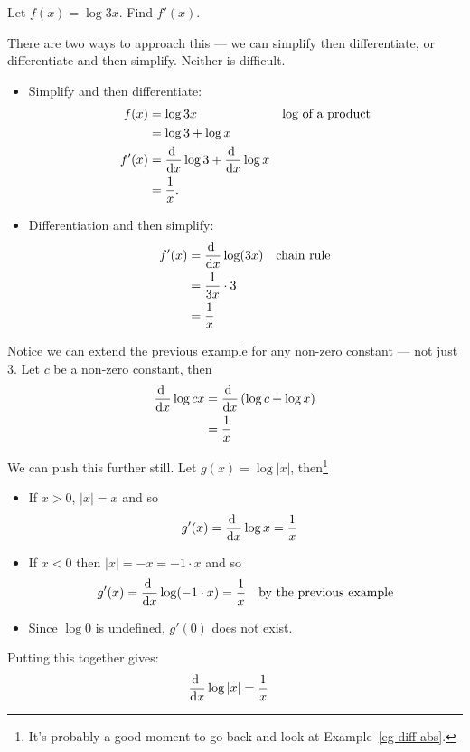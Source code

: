 \begin{eg}
 Let $f(x) = \log 3x$. Find $f'(x)$.

There are two ways to approach this --- we can simplify then differentiate, or
differentiate and then simplify. Neither is difficult.
\begin{itemize}
 \item Simplify and then differentiate:
  \begin{align*}
  f(x) &= \log 3x & \text{log of a product} \\
  &= \log 3 + \log x \\
  f'(x) &= \diff{}{x} \log 3 + \diff{}{x} \log x \\
  &= \frac{1}{x}.
\end{align*}
\item Differentiation and then simplify:
  \begin{align*}
  f'(x) &= \diff{}{x} \log(3x) & \text{chain rule} \\
  &= \frac{1}{3x} \cdot 3 \\
  &= \frac{1}{x}
\end{align*}
\end{itemize}
\end{eg}
\begin{eg}
Notice we can extend the previous example for any non-zero constant --- not
just 3. Let $c$ be a non-zero constant, then
\begin{align*}
  \diff{}{x} \log cx &= \diff{}{x}\left(\log c + \log x \right)\\
  &= \frac{1}{x}
\end{align*}
\end{eg}
\begin{eg}\label{eg diff log abs x}
 We can push this further still. Let $g(x) = \log | x |$, then\footnote{It's
probably a good moment to go back and look at Example~\ref{eg diff abs}.}
\begin{itemize}
 \item If $x>0$, $|x|= x$ and so
\begin{align*}
  g'(x) &= \diff{}{x} \log x = \frac{1}{x}
\end{align*}
\item If $x<0$ then $|x|= -x =-1\cdot x$ and so
\begin{align*}
  g'(x) &= \diff{}{x} \log(-1 \cdot x) = \frac{1}{x} &\text{by the previous
example}
\end{align*}
\item Since $\log 0$ is undefined, $g'(0)$ does not exist.
\end{itemize}
Putting this together gives:
\begin{align*}
  \diff{}{x} \log | x | &= \frac{1}{x}
\end{align*}
\end{eg}




